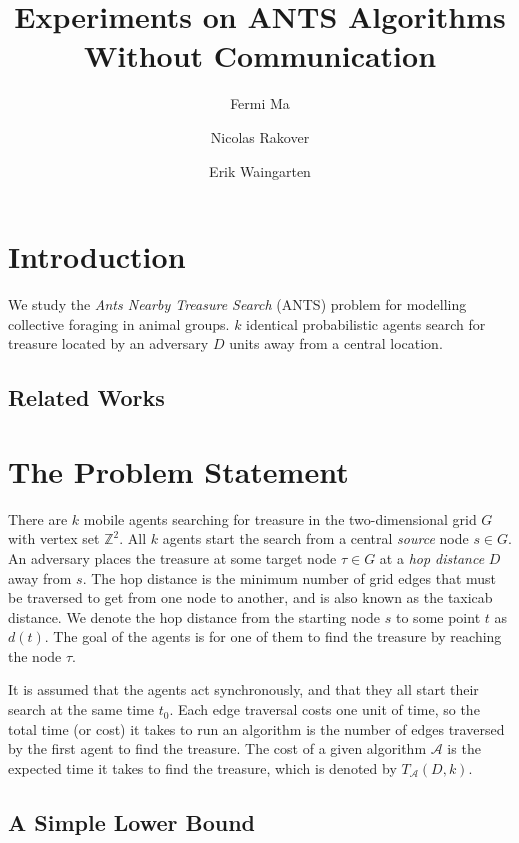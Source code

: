 \documentclass[runningheads,a4paper]{llncs}
\begin{document}
\mainmatter  

\title{Experiments on ANTS Algorithms Without Communication}
\author{Fermi Ma \and Nicolas Rakover \and Erik Waingarten}

\maketitle

\section{Introduction}

We study the \emph{Ants Nearby Treasure Search} (ANTS) problem for modelling collective foraging in animal groups. $k$ identical probabilistic agents search for treasure located by an adversary $D$ units away from a central location.

\subsection{Related Works}

\section{The Problem Statement}

There are $k$ mobile agents searching for treasure in the two-dimensional grid $G$ with vertex set $\mathbb{Z}^2$. All $k$ agents start the search from a central \emph{source} node $s \in G$. An adversary places the treasure at some target node $\tau \in G$ at a \emph{hop distance} $D$ away from $s$. The hop distance is the minimum number of grid edges that must be traversed to get from one node to another, and is also known as the taxicab distance. We denote the hop distance from the starting node $s$ to some point $t$ as $d(t)$. The goal of the agents is for one of them to find the treasure by reaching the node $\tau$.

It is assumed that the agents act synchronously, and that they all start their search at the same time $t_0$. Each edge traversal costs one unit of time, so the total time (or cost) it takes to run an algorithm is the number of edges traversed by the first agent to find the treasure. The cost of a given algorithm $\mathcal{A}$ is the expected time it takes to find the treasure, which is denoted by $T_\mathcal{A}(D,k)$.

\subsection{A Simple Lower Bound}
\end{document}
